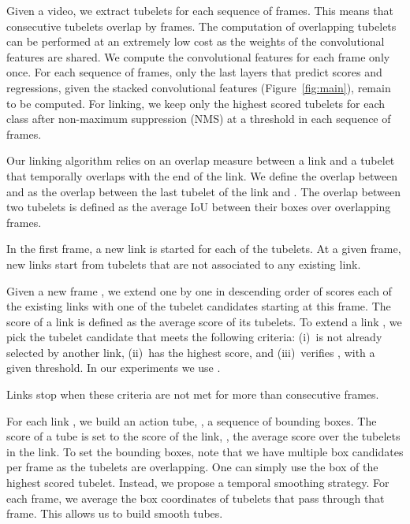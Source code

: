 \documentclass[10pt,twocolumn,letterpaper]{article}
\begin{document}
Given a video, we extract tubelets for each sequence of  frames. This means that consecutive tubelets overlap by  frames. The computation of overlapping tubelets can be performed at an extremely low cost as the weights of the convolutional features are shared. We compute the convolutional features for each frame only once. For each sequence of frames, only the last layers that predict scores and regressions, given the stacked convolutional features (Figure~\ref{fig:main}), remain to be computed. For linking, we keep only the  highest scored tubelets for each class after non-maximum suppression (NMS) at a threshold  in each sequence of frames.

Our linking algorithm relies on an overlap measure  between a link  and a tubelet  that temporally overlaps with the end of the link. We define the overlap between  and  as the overlap between the last tubelet of the link  and . The overlap between two tubelets is defined as the average IoU between their boxes over overlapping frames.

In the first frame, a new link is started for each of the  tubelets. 
At a given frame, new links start from tubelets that are not associated to any existing link.

Given a new frame , we extend one by one in descending order of scores each of the existing links with one of the  tubelet candidates starting at this frame. The score of a link is defined as the average score of its tubelets. 
To extend a link , we pick the tubelet candidate  that meets the following criteria: (i)~is not already selected by another link, (ii)~has the highest score, and (iii)~verifies , with  a given threshold. In our experiments we use .

Links stop when these criteria are not met for more than  consecutive frames. 

 For each link , we build an action tube, \ie, a sequence of bounding boxes. The score of a tube is set to the score of the link, \ie, the average score over the tubelets in the link. To set the bounding boxes, note that we have multiple box candidates per frame as the tubelets are overlapping. One can simply use the box of the highest scored tubelet. Instead,  we propose a temporal smoothing strategy. For each frame, we average the box coordinates of tubelets that pass through that frame. This allows us to build smooth tubes. 
\end{document}
